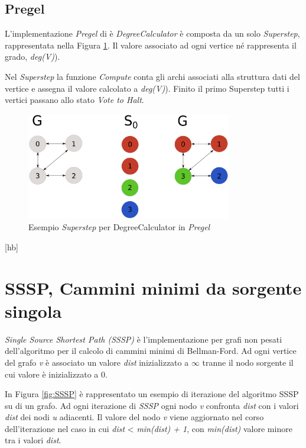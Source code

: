 \documentclass[LaM,binding=0.6cm]{sapthesis}
\begin{document}
\subsection{Pregel}

L'implementazione \textit{Pregel}  di è \textit{DegreeCalculator} è composta da un solo \textit{Superstep}, rappresentata nella Figura \ref{fig:GIRAPHDEGREE}. Il valore associato ad ogni vertice né rappresenta il grado, \textit{deg(V)}).

Nel \textit{Superstep} la funzione \textit{Compute} conta gli archi associati alla struttura dati del vertice e assegna il valore calcolato a \textit{deg(V)}). Finito il primo Superstep tutti i vertici passano allo stato \textit{Vote to Halt}.

\begin{figure}
\centering
\includegraphics[width=0.8\textwidth]{Pregel-DegreeCalculator}
\caption{Esempio  \textit{Superstep} per  DegreeCalculator in \textit{Pregel}}
\label{fig:GIRAPHDEGREE}
\end{figure}

\begin{minipage}{\linewidth}[hb]

\end{minipage}

	\section{SSSP, Cammini minimi da sorgente singola}

\textit{Single Source Shortest Path (SSSP)} è l'implementazione per grafi non pesati dell'algoritmo per il calcolo di cammini minimi di Bellman-Ford. Ad ogni vertice del grafo \textit{v} è associato un valore \textit{dist} inizializzato a $\infty$ tranne il nodo sorgente il cui valore è inizializzato a 0.

In Figura \ref{fig:SSSP} è rappresentato un esempio di iterazione del algoritmo SSSP su di un grafo. 
Ad ogni iterazione di \textit{SSSP} ogni nodo \textit{v} confronta \textit{dist} con i valori \textit{dist} dei nodi \textit{u} adiacenti.
Il valore del nodo \textit{v} viene aggiornato nel corso dell'iterazione nel caso in cui \textit{dist} < \textit{min(dist) + 1}, con \textit{min(dist)} valore minore tra i valori \textit{dist}. 
\end{document}
